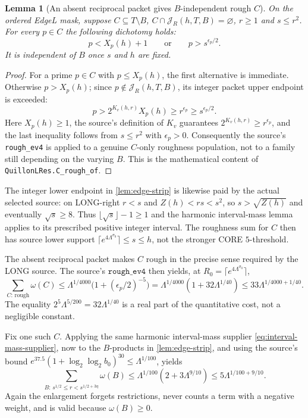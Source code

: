\documentclass[11pt]{article}
\newcommand{\Lam}{\Lambda}
\newcommand{\omegaR}{\omega}
\newcommand{\JR}{\mathcal J_R}
\newcommand{\epsp}{\epsilon_p}
\newtheorem{lemma}[theorem]{Lemma}
\theoremstyle{definition}
\theoremstyle{remark}
\newcommand{\1}{\mathbf 1}
\begin{document}
\begin{lemma}[An absent reciprocal packet gives $B$-independent rough $C$]
\label{lem:edge-rough-transport}
On the ordered EdgeL mask, suppose $C\subseteq T\setminus B$,
$C\cap\JR(h,T,B)=\varnothing$, $r\ge1$ and $s\le r^2$.
For every $p\in C$ the following dichotomy holds:
\begin{equation}\label{eq:edge-rough-bridge}
 p<X_p(h)+1\qquad\text{or}\qquad p>s^{\epsp/2}.
\end{equation}
It is independent of $B$ once $s$ and $h$ are fixed.
\end{lemma}
\begin{proof}
For a prime $p\in C$ with $p\le X_p(h)$, the first alternative
is immediate. Otherwise $p>X_p(h)$; since $p\notin\JR(h,T,B)$,
its integer packet upper endpoint is exceeded:
\[
 p>2^{K_v(h,r)}X_p(h)\ge r^{\epsp}
       \ge s^{\epsp/2}.
\]
Here $X_p(h)\ge1$, the source's definition of $K_v$ guarantees
$2^{K_v(h,r)}\ge r^{\epsp}$, and the last inequality follows from
$s\le r^2$ with $\epsp>0$. Consequently the source's
\texttt{rough\_ev4} is applied to a genuine $C$-only roughness
population, not to a family still depending on the varying $B$.
This is the mathematical content of
\texttt{QuillonLRes.C\_rough\_of}.
\end{proof}

The integer lower endpoint in \cref{lem:edge-strip} is likewise
paid by the actual selected source: on LONG-right $r<s$ and
$Z(h)<rs<s^2$, so $s>\sqrt{Z(h)}$ and eventually
$\sqrt s\ge8$. Thus
$\lfloor\sqrt s\rfloor-1\ge1$ and the harmonic interval-mass
lemma applies to its prescribed positive integer interval. The
roughness sum for $C$ then has source lower support
$\lceil e^{4\Lam^{\sigma_0}}\rceil\le s\le h$,
not the stronger CORE $5$-threshold.

The absent reciprocal packet makes $C$ rough in the precise
sense required by the LONG source. The source's $\texttt{rough\_ev4}$
then yields, at $R_0=\lceil e^{4\Lam^{\sigma_0}}\rceil$,
\begin{equation}\label{eq:edge-C-bound}
 \sum_{C:\,\mathrm{rough}}\omegaR(C)
 \le\Lam^{1/4000}\bigl(1+(\epsp/2)^{-5}\bigr)
 =\Lam^{1/4000}(1+32\Lam^{1/40})
 \le33\Lam^{1/4000+1/40}.
\end{equation}
The equality $2^5\Lam^{5/200}=32\Lam^{1/40}$ is a
real part of the quantitative cost, not a negligible constant.

Fix one such $C$. Applying the same harmonic interval-mass
supplier \eqref{eq:interval-mass-supplier}, now to the
$B$-products in \cref{lem:edge-strip}, and using the
source's bound $e^{37.5}(1+\log_2\log_2 b_0)^{30}\le
\Lam^{1/100}$, yields
\begin{equation}\label{eq:edge-B-bound}
 \sum_{B:\,s^{1/2}\le r<s^{1/2+3\eta}}\omegaR(B)
 \le\Lam^{1/100}(2+3\Lam^{9/10})
 \le5\Lam^{1/100+9/10}.
\end{equation}
Again the enlargement forgets restrictions, never counts a
term with a negative weight, and is valid because $\omegaR(B)\ge0$.
\end{document}
